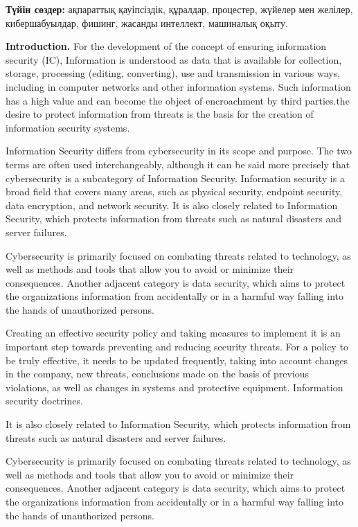 \textbf{Түйін сөздер:} ақпараттық қауіпсіздік, құралдар, процестер,
жүйелер мен желілер, кибершабуылдар, фишинг, жасанды интеллект,
машиналық оқыту.

\textbf{Introduction.} For the development of the concept of ensuring
information security (IC), Information is understood as data that is
available for collection, storage, processing (editing, converting), use
and transmission in various ways, including in computer networks and
other information systems. Such information has a high value and can
become the object of encroachment by third parties.the desire to protect
information from threats is the basis for the creation of information
security systems.

Information Security differs from cybersecurity in its scope and
purpose. The two terms are often used interchangeably, although it can
be said more precisely that cybersecurity is a subcategory of
Information Security. Information security is a broad field that covers
many areas, such as physical security, endpoint security, data
encryption, and network security. It is also closely related to
Information Security, which protects information from threats such as
natural disasters and server failures.

Cybersecurity is primarily focused on combating threats related to
technology, as well as methods and tools that allow you to avoid or
minimize their consequences. Another adjacent category is data security,
which aims to protect the organization\textquotesingle s information
from accidentally or in a harmful way falling into the hands of
unauthorized persons.

Creating an effective security policy and taking measures to implement
it is an important step towards preventing and reducing security
threats. For a policy to be truly effective, it needs to be updated
frequently, taking into account changes in the company, new threats,
conclusions made on the basis of previous violations, as well as changes
in systems and protective equipment. Information security doctrines.

It is also closely related to Information Security, which protects
information from threats such as natural disasters and server failures.

Cybersecurity is primarily focused on combating threats related to
technology, as well as methods and tools that allow you to avoid or
minimize their consequences. Another adjacent category is data security,
which aims to protect the organization\textquotesingle s information
from accidentally or in a harmful way falling into the hands of
unauthorized persons.


